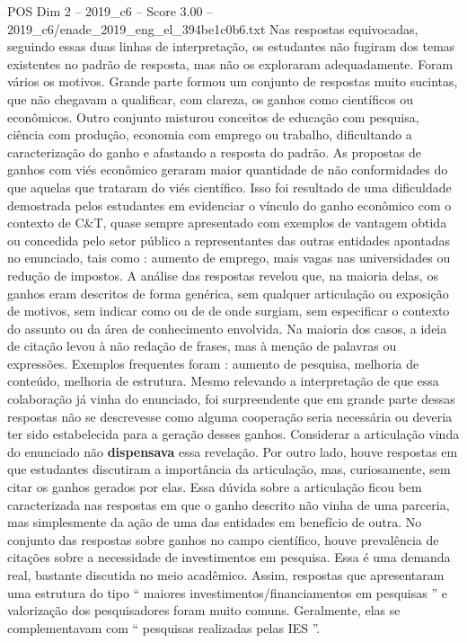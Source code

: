 \begin{textsample}{POS Dim 2 – 2019\_c6 – Score 3.00 – 2019\_c6/enade\_2019\_eng\_el\_394be1c0b6.txt}
Nas respostas equivocadas, seguindo essas duas linhas de interpretação, os estudantes não fugiram dos temas existentes no padrão de resposta, mas não os exploraram adequadamente.
Foram vários os motivos.
Grande parte formou um conjunto de respostas muito sucintas, que não chegavam a qualificar, com clareza, os ganhos como científicos ou econômicos.
Outro conjunto misturou conceitos de educação com pesquisa, ciência com produção, economia com emprego ou trabalho, dificultando a caracterização do ganho e afastando a resposta do padrão.
As propostas de ganhos com viés econômico geraram maior quantidade de não conformidades do que aquelas que trataram do viés científico.
Isso foi resultado de uma dificuldade demostrada pelos estudantes em evidenciar o vínculo do ganho econômico com o contexto de C\&T, quase sempre apresentado com exemplos de vantagem obtida ou concedida pelo setor público a representantes das outras entidades apontadas no enunciado, tais como : aumento de emprego, mais vagas nas universidades ou redução de impostos.
A análise das respostas revelou que, na maioria delas, os ganhos eram descritos de forma genérica, sem qualquer articulação ou exposição de motivos, sem indicar como ou de de onde surgiam, sem especificar o contexto do assunto ou da área de conhecimento envolvida.
Na maioria dos casos, a ideia de citação levou à não redação de frases, mas à menção de palavras ou expressões.
Exemplos frequentes foram : aumento de pesquisa, melhoria de conteúdo, melhoria de estrutura.
Mesmo relevando a interpretação de que essa colaboração já vinha do enunciado, foi surpreendente que em grande parte dessas respostas não se descrevesse como alguma cooperação seria necessária ou deveria ter sido estabelecida para a geração desses ganhos.
Considerar a articulação vinda do enunciado não \textbf{dispensava} essa revelação.
Por outro lado, houve respostas em que estudantes discutiram a importância da articulação, mas, curiosamente, sem citar os ganhos gerados por elas.
Essa dúvida sobre a articulação ficou bem caracterizada nas respostas em que o ganho descrito não vinha de uma parceria, mas simplesmente da ação de uma das entidades em benefício de outra.
No conjunto das respostas sobre ganhos no campo científico, houve prevalência de citações sobre a necessidade de investimentos em pesquisa.
Essa é uma demanda real, bastante discutida no meio acadêmico.
Assim, respostas que apresentaram uma estrutura do tipo “ maiores investimentos/financiamentos em pesquisas ” e valorização dos pesquisadores foram muito comuns.
Geralmente, elas se complementavam com “ pesquisas realizadas pelas IES ”.

\end{textsample}
